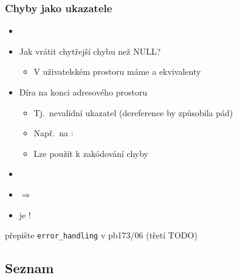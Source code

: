 \begin{frame}
  \frametitle{Chyby jako ukazatele}

  \begin{itemize}
    \item {}
    \item Jak vrátit chytřejší chybu než NULL?

    \pause

    \begin{itemize}
      \item V uživatelském prostoru máme  a ekvivalenty
    \end{itemize}

    \pause

    \item Díra na konci adresového prostoru
    \begin{itemize}
      \item Tj.\ nevalidní ukazatel (dereference by způsobila pád)
      \item Např.\ na \xesh: 
      \item Lze použít k zakódování chyby
    \end{itemize}

    \pause

    \item {}
    \item {} $\Rightarrow$ 

    \pause

    \item {} je !
  \end{itemize}

  \pause
  \bigskip

   přepište \texttt{error\_handling} v pb173/06 (třetí TODO)

\end{frame}


\iffimuni
\subsection{Seznam}
\fi

